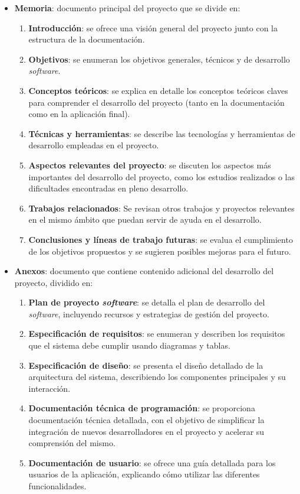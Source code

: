 \begin{itemize}
	\item \textbf{Memoria}: documento principal del proyecto que se divide en:
	\begin{enumerate}
		\item \textbf{Introducción}: se ofrece una visión general del proyecto junto con la estructura de la documentación.
		\item \textbf{Objetivos}: se enumeran los objetivos generales, técnicos y de desarrollo \textit{software}.
		\item \textbf{Conceptos teóricos}: se explica en detalle los conceptos teóricos claves para comprender el desarrollo del proyecto (tanto en la documentación como en la aplicación final).
		\item \textbf{Técnicas y herramientas}: se describe las tecnologías y herramientas de desarrollo empleadas en el proyecto.
		\item \textbf{Aspectos relevantes del proyecto}: se discuten los aspectos más importantes del desarrollo del proyecto, como los estudios realizados o las dificultades encontradas en pleno desarrollo.
		\item \textbf{Trabajos relacionados}: Se revisan otros trabajos y proyectos relevantes en el mismo ámbito que puedan servir de ayuda en el desarrollo.
		\item \textbf{Conclusiones y líneas de trabajo futuras}: se evalua el cumplimiento de los objetivos propuestos y se sugieren posibles mejoras para el futuro.
	\end{enumerate}
	\item \textbf{Anexos}: documento que contiene contenido adicional del desarrollo del proyecto, dividido en:
	\begin{enumerate}
		\item \textbf{Plan de proyecto \textit{software}}: se detalla el plan de desarrollo del \textit{software}, incluyendo recursos y estrategias de gestión del proyecto.
		\item \textbf{Especificación de requisitos}: se enumeran y describen los requisitos que el sistema debe cumplir usando diagramas y tablas.
		\item \textbf{Especificación de diseño}: se presenta el diseño detallado de la arquitectura del sistema, describiendo los componentes principales y su interacción.
		\item \textbf{Documentación técnica de programación}: se proporciona documentación técnica detallada, con el objetivo de simplificar la integración de nuevos desarrolladores en el proyecto y acelerar su comprensión del mismo.
		\item \textbf{Documentación de usuario}: se ofrece una guía detallada para los usuarios de la aplicación, explicando cómo utilizar las diferentes funcionalidades.
	\end{enumerate}
\end{itemize}


